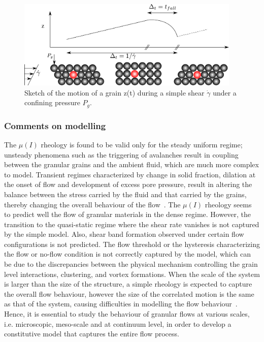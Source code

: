 \begin{figure}[htbp]
\centering
\includegraphics[width=0.95\textwidth]{tmicro}
\caption{Sketch of the motion of a grain z(t) during a simple shear 
$\dot{\gamma}$ under a confining pressure $P_g$.}
\label{fig:tmicro}
\end{figure}

\newpage

\subsubsection{Comments on modelling}

The $\mu(\textit{I})$ rheology is found to be valid only for the steady uniform 
regime; unsteady phenomena such as the triggering of avalanches result in 
coupling between the granular grains and the ambient fluid, which are much more 
complex to model. Transient regimes characterized by change in solid fraction, 
dilation at the onset of flow and development of excess pore pressure, result 
in altering the balance between the stress carried by the fluid and that 
carried by the grains, thereby changing the overall behaviour of the 
flow~\citep{Denlinger2001}. The $\mu (I)$ rheology seems to predict well the 
flow of granular materials in the dense regime. However, the transition to the 
quasi-static regime where the shear rate vanishes is not captured by the simple 
model. Also, shear band formation observed under certain flow configurations is 
not predicted. The flow threshold or the hysteresis characterizing the flow or 
no-flow condition is not correctly captured by the model, which can be due to 
the discrepancies between the physical mechanism controlling the grain level 
interactions, clustering, and vortex formations. When the scale of the system 
is larger than the size of the structure, a simple rheology is expected to 
capture the overall flow behaviour, however the size of the correlated motion 
is the same as that of the system, causing difficulties in modelling the flow 
behaviour~\citep{Pouliquen2005}. Hence, it is essential to study the behaviour 
of granular flows at various scales, i.e. microscopic, meso-scale and at 
continuum level, in order to develop a constitutive model that captures the 
entire flow process.

